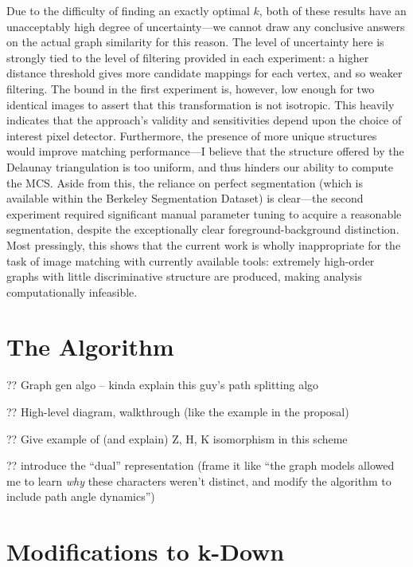 \documentclass{mpaper}
\begin{document}
\noindent Due to the difficulty of finding an exactly optimal $k$, both of these results have an unacceptably high degree of uncertainty---we cannot draw any conclusive answers on the actual graph similarity for this reason.
The level of uncertainty here is strongly tied to the level of filtering provided in each experiment: a higher distance threshold gives more candidate mappings for each vertex, and so weaker filtering.
The bound in the first experiment is, however, low enough for two identical images to assert that this transformation is not isotropic.
This heavily indicates that the approach's validity and sensitivities depend upon the choice of interest pixel detector.
Furthermore, the presence of more unique structures would improve matching performance---I believe that the structure offered by the Delaunay triangulation is too uniform, and thus hinders our ability to compute the MCS.
Aside from this, the reliance on perfect segmentation (which is available within the Berkeley Segmentation Dataset) is clear---the second experiment required significant manual parameter tuning to acquire a reasonable segmentation, despite the exceptionally clear foreground-background distinction.
Most pressingly, this shows that the current work is wholly inappropriate for the task of image matching with currently available tools: extremely high-order graphs with little discriminative structure are produced, making analysis computationally infeasible.

\section{The Algorithm}
\label{sec:algorithm}

?? Graph gen algo -- kinda explain this guy's path splitting algo \cite{PathCurvature}

?? High-level diagram, walkthrough (like the example in the proposal)

?? Give example of (and explain) Z, H, K isomorphism in this scheme

?? introduce the ``dual'' representation (frame it like ``the graph models allowed me to learn \emph{why} these characters weren't distinct, and modify the algorithm to include path angle dynamics'')

\section{Modifications to k-Down}
\label{sec:k-down-mods}
\end{document}
